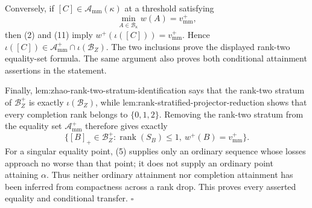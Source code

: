 Conversely, if \([C]\in\mathcal A_{\mathrm{mm}}(\kappa)\) at a threshold satisfying
\[
\min_{A\in\mathcal B_\kappa}w(A)=v_{\mathrm{mm}}^+,
\tag{11}
\]
then (2) and (11) imply \(w^+(\iota([C]))=v_{\mathrm{mm}}^+\).  Hence \(\iota([C])\in\mathcal A_{\mathrm{mm}}^+\cap\iota(\mathcal B_Z)\).  The two inclusions prove the displayed rank-two equality-set formula.  The same argument also proves both conditional attainment assertions in the statement.

Finally, lem:zhao-rank-two-stratum-identification says that the rank-two stratum of \(\mathcal B_Z^+\) is exactly \(\iota(\mathcal B_Z)\), while lem:rank-stratified-projector-reduction shows that every completion rank belongs to \(\{0,1,2\}\).  Removing the rank-two stratum from the equality set \(\mathcal A_{\mathrm{mm}}^+\) therefore gives exactly
\[
\{[B]_+\in\mathcal B_Z^+:\operatorname{rank}(S_B)\le1,\ w^+(B)=v_{\mathrm{mm}}^+\}.
\tag{12}
\]
For a singular equality point, (5) supplies only an ordinary sequence whose losses approach no worse than that point; it does not supply an ordinary point attaining \(\alpha\).  Thus neither ordinary attainment nor completion attainment has been inferred from compactness across a rank drop.  This proves every asserted equality and conditional transfer. \(\square\)